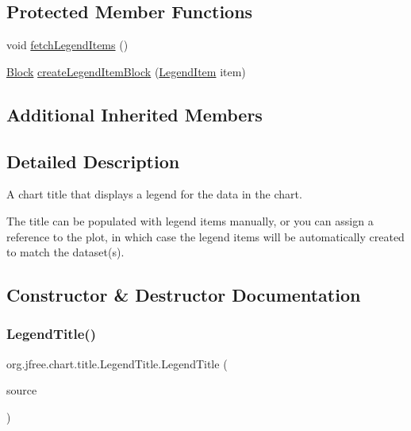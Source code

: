 \subsection*{Protected Member Functions}
\begin{DoxyCompactItemize}
\item 
void \mbox{\hyperlink{classorg_1_1jfree_1_1chart_1_1title_1_1_legend_title_a04c4b0bd0088295c7bc667549a1cee70}{fetch\+Legend\+Items}} ()
\item 
\mbox{\hyperlink{interfaceorg_1_1jfree_1_1chart_1_1block_1_1_block}{Block}} \mbox{\hyperlink{classorg_1_1jfree_1_1chart_1_1title_1_1_legend_title_a091d582c8a45e6399e6a61419c423165}{create\+Legend\+Item\+Block}} (\mbox{\hyperlink{classorg_1_1jfree_1_1chart_1_1_legend_item}{Legend\+Item}} item)
\end{DoxyCompactItemize}
\subsection*{Additional Inherited Members}


\subsection{Detailed Description}
A chart title that displays a legend for the data in the chart. 

The title can be populated with legend items manually, or you can assign a reference to the plot, in which case the legend items will be automatically created to match the dataset(s). 

\subsection{Constructor \& Destructor Documentation}
\mbox{\label{classorg_1_1jfree_1_1chart_1_1title_1_1_legend_title_a1c5840bec8d17c4452de970aec4acef5}} 
\subsubsection{\texorpdfstring{Legend\+Title()}{LegendTitle()}\hspace{0.1cm}{\footnotesize\ttfamily [1/2]}}
{\footnotesize\ttfamily org.\+jfree.\+chart.\+title.\+Legend\+Title.\+Legend\+Title (\begin{DoxyParamCaption}\item[{\mbox{\hyperlink{interfaceorg_1_1jfree_1_1chart_1_1_legend_item_source}{Legend\+Item\+Source}}}]{source }\end{DoxyParamCaption})}

